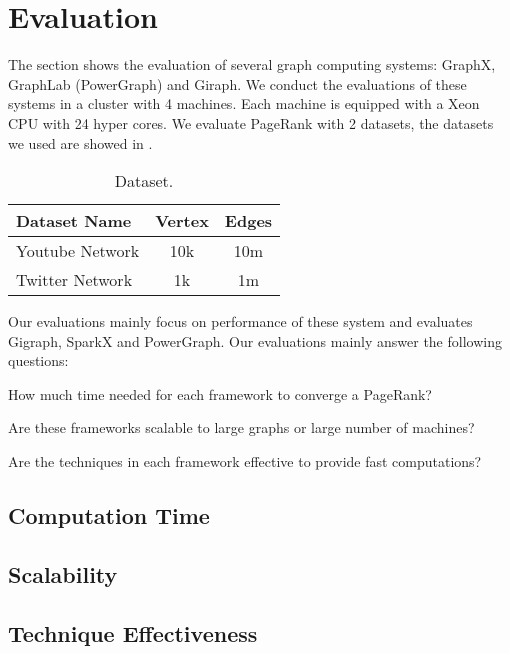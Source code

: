 \section{Evaluation}
The section shows the evaluation of several graph computing systems:
GraphX, GraphLab (PowerGraph) and Giraph.
We conduct the evaluations of these systems in a cluster with 4 machines.
Each machine is equipped with a Xeon CPU with 24 hyper cores.
We evaluate PageRank with 2 datasets, the datasets we used are showed in
.

\begin{table}[tbh]
  \begin{tabular}{l|c|c}
    \textbf{Dataset Name} & \textbf{Vertex} & \textbf{Edges} \\
      \hline
      Youtube Network & 10k & 10m \\
      \hline
      Twitter Network & 1k & 1m
  \end{tabular}
  \caption{Dataset.}
  \label{tab:dataset}
\end{table}

Our evaluations mainly focus on performance of these system and evaluates
Gigraph, SparkX and PowerGraph.
Our evaluations mainly answer the following questions:
\begin{tightenum}

\item[\S\ref{subsec:time}:] How much time needed for each framework
to converge a PageRank?

\item[\S\ref{subsec:scalability}:] Are these frameworks scalable to
large graphs or large number of machines?

\item[\S\ref{subsec:technique}:] Are the techniques in each framework
effective to provide fast computations?
\end{tightenum}

\subsection{Computation Time} \label{subsec:time}

\subsection{Scalability} \label{subsec:scalability}

\subsection{Technique Effectiveness} \label{subsec:technique}


